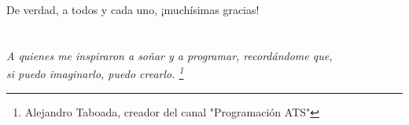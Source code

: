 De verdad, a todos y cada uno, ¡muchísimas gracias!

\cleardoublepage %
\chapter*{}
\setlength{\leftmargin}{0.5\textwidth}
\setlength{\parsep}{0cm}
\addtolength{\topsep}{0.5cm}
\begin{flushright}
\small\em{
A quienes me inspiraron a soñar y a programar, recordándome que,\\
si puedo imaginarlo, puedo crearlo. \footnote{Alejandro Taboada, creador del canal "Programación ATS"}
}
\end{flushright}
